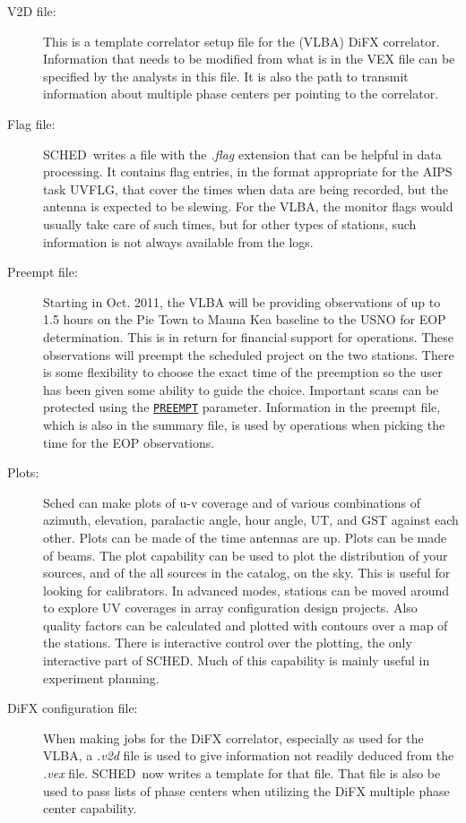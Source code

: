 \documentclass{report}
\newcommand{\schedb}{{\sc SCHED~}}
\begin{document}
\begin{description}
\item[V2D file:] This is a template correlator setup file for the
(VLBA) DiFX correlator.  Information that needs to be modified from what
is in the VEX file can be specified by the analysts in this file.
It is also the path to transmit information about multiple phase
centers per pointing to the correlator.

\item[Flag file:] \schedb writes a file with the {\sl .flag} extension
that can be helpful in data processing.  It contains flag entries, in
the format appropriate for the AIPS task UVFLG, that cover the times
when data are being recorded, but the antenna is expected to be
slewing.  For the VLBA, the monitor flags would usually take care of
such times, but for other types of stations, such information is not
always available from the logs.

\item[Preempt file:] Starting in Oct. 2011, the VLBA will be providing
observations of up to 1.5 hours on the Pie Town to Mauna Kea baseline
to the USNO for EOP determination.  This is in return for financial
support for operations.  These observations will preempt the scheduled
project on the two stations.  There is some flexibility to choose the
exact time of the preemption so the user has been given some ability
to guide the choice.  Important scans can be protected using the
{\hyperref[MP:PREEMPT]{{\tt PREEMPT}}} parameter.  Information in the
preempt file, which is also in the summary file, is used by operations
when picking the time for the EOP observations.

\item[Plots:] Sched can make plots of u-v coverage and of various
combinations of azimuth, elevation, paralactic angle, hour angle, UT,
and GST against each other.  Plots can be made of the time antennas
are up.  Plots can be made of beams.  The plot capability can be used
to plot the distribution of your sources, and of the all sources in
the catalog, on the sky.  This is useful for looking for calibrators.
In advanced modes, stations can be moved around to explore UV
coverages in array configuration design projects.  Also quality
factors can be calculated and plotted with contours over a map of the
stations.  There is interactive control over the plotting, the only
interactive part of SCHED.  Much of this capability is mainly useful
in experiment planning.

\item[DiFX configuration file:]  When making jobs for the DiFX
correlator, especially as used for the VLBA, a {\sl .v2d} file is
used to give information not readily deduced from the {\sl .vex}
file.  \schedb now writes a template for that file.  That file is
also be used to pass lists of phase centers when utilizing the DiFX
multiple phase center capability.


\end{description}
\end{document}
